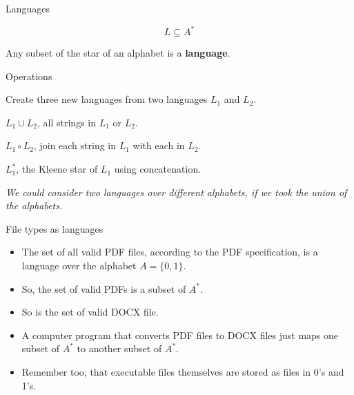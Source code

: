 \begin{frame}{Languages}
  \begin{topdisp}
    $$ L \subseteq A^* $$
  \end{topdisp}

  Any subset of the star of an alphabet is a \textbf{language}.

  \begin{alertblock}{Operations}

    Create three new languages from two languages $L_1$ and $L_2$.

    \begin{description}[Concatenate:]
      \item[Union:] $L_1 \cup L_2$, all strings in $L_1$ or $L_2$.
      \item[Concatenate:] $L_1 \circ L_2$, join each string in $L_1$ with each in $L_2$.
      \item[Star:] $L_1^*$, the Kleene star of $L_1$ using concatenation.
    \end{description}
  \end{alertblock}

  \emph{We could consider two languages over different alphabets, if we took the union of the alphabets.}
\end{frame}


\begin{frame}{File types as languages}
  \begin{itemize}
    \setlength\itemsep{3mm}
    \item The set of all valid PDF files, according to the PDF specification, is a language over the alphabet $A =\{0,1\}$.
    \item So, the set of valid PDFs is a subset of $A^*$.
    \item So is the set of valid DOCX file.
    \item A computer program that converts PDF files to DOCX files just maps one subset of $A^*$ to another subset of $A^*$.
    \item Remember too, that executable files themselves are stored as files in 0's and 1's.
  \end{itemize}
\end{frame}